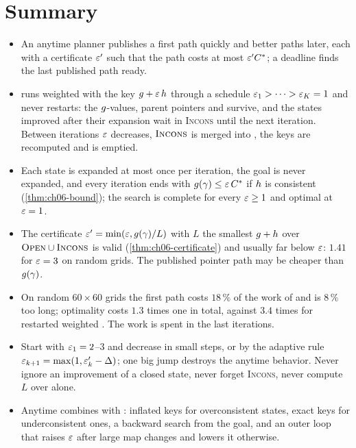 \section{Summary}
\begin{summary}
\begin{itemize}
  \item An anytime planner publishes a first path quickly and better paths
        later, each with a certificate $\varepsilon'$ such that the path costs at
        most $\varepsilon' C^*$; a deadline finds the last published path ready.
  \item \arastar runs weighted \astar with the key $g + \varepsilon\,h$
        through a schedule $\varepsilon_1 > \dots > \varepsilon_K = 1$ and never restarts:
        the $g$-values, parent pointers and \Open survive, and the states
        improved after their expansion wait in \textsc{Incons} until the next
        iteration. Between iterations $\varepsilon$ decreases, $\textsc{Incons}$ is
        merged into \Open, the keys are recomputed and \Closed is emptied.
  \item Each state is expanded at most once per iteration, the goal is never
        expanded, and every iteration ends with $g(\gamma) \le \varepsilon\,C^*$
        if $h$ is consistent (\cref{thm:ch06-bound}); the search is
        complete for every $\varepsilon \ge 1$ and optimal at $\varepsilon = 1$.
  \item The certificate $\varepsilon' = \min(\varepsilon, g(\gamma)/L)$ with $L$ the
        smallest $g + h$ over $\textsc{Open} \cup \textsc{Incons}$ is valid
        (\cref{thm:ch06-certificate}) and usually far below $\varepsilon$: $1.41$
        for $\varepsilon = 3$ on random grids. The published pointer path may be
        cheaper than $g(\gamma)$.
  \item On random $60 \times 60$ grids the first path costs $18\,\%$ of the
        work of \astar and is $8\,\%$ too long; optimality costs $1.3$ times
        one \astar in total, against $3.4$ times for restarted weighted
        \astar. The work is spent in the last iterations.
  \item Start with $\varepsilon_1 = 2$--$3$ and decrease in small steps, or by the
        adaptive rule $\varepsilon_{k+1} = \max(1, \varepsilon'_k - \Delta)$; one big jump
        destroys the anytime behavior. Never ignore an improvement of a
        closed state, never forget \textsc{Incons}, never compute $L$ over
        \Open alone.
  \item Anytime \dstar combines \arastar with \dstarlite: inflated keys for
        overconsistent states, exact keys for underconsistent ones, a
        backward search from the goal, and an outer loop that raises $\varepsilon$
        after large map changes and lowers it otherwise.
\end{itemize}
\end{summary}

